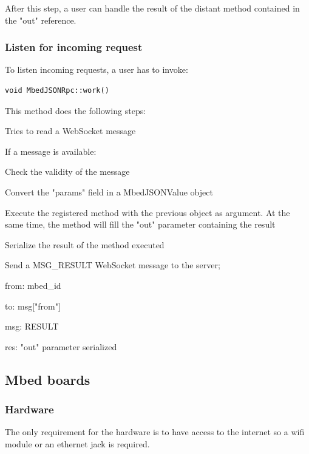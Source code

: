 \documentclass[pdftex,10pt,a4paper]{report}
\newenvironment{packed_item}{
\begin{itemize}
  \setlength{\itemsep}{1pt}
  \setlength{\parskip}{0pt}
  \setlength{\parsep}{0pt}
}{\end{itemize}}
\begin{document}
After this step, a user can handle the result of the distant method contained in the "out" reference.

\subsubsection{Listen for incoming request}
To listen incoming requests, a user has to invoke:
\begin{lstlisting}[label=Listen incoming requests,caption=Listen incoming requests]
void MbedJSONRpc::work()
\end{lstlisting}

This method does the following steps:
\begin{packed_item}
	\item Tries to read a WebSocket message
	\item If a message is available:
		\begin{packed_item}
			\item Check the validity of the message
			\item Convert the "params" field in a MbedJSONValue object
			\item Execute the registered method with the previous object as argument. At the same time, the method will fill the "out" parameter containing the result
			\item Serialize the result of the method executed
			\item Send a MSG\_RESULT WebSocket message to the server;
			\begin{packed_item}
				\item from: mbed\_id
				\item to: msg["from"]
				\item msg: RESULT
				\item res: "out" parameter serialized
			\end{packed_item}
		\end{packed_item}
\end{packed_item}


\subsection{Mbed boards}
\subsubsection{Hardware}
The only requirement for the hardware is to have access to the internet so a wifi module or an ethernet jack is required.
\end{document}
